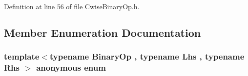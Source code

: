Definition at line 56 of file Cwise\-Binary\-Op.\-h.



\subsection{Member Enumeration Documentation}
\hypertarget{structei__traits_3_01_cwise_binary_op_3_01_binary_op_00_01_lhs_00_01_rhs_01_4_01_4_a5fc7c228c608ef3fd3ae92e131896644}{\subsubsection[{anonymous enum}]{\setlength{\rightskip}{0pt plus 5cm}template$<$typename Binary\-Op , typename Lhs , typename Rhs $>$ anonymous enum}}\label{structei__traits_3_01_cwise_binary_op_3_01_binary_op_00_01_lhs_00_01_rhs_01_4_01_4_a5fc7c228c608ef3fd3ae92e131896644}
